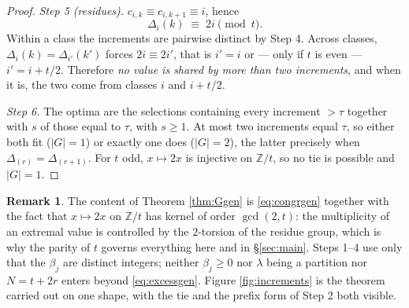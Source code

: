 \documentclass[11pt,reqno]{amsart}
\theoremstyle{plain}
\theoremstyle{definition}
\newtheorem{remark}[theorem]{Remark}
\newcommand{\ZZ}{\mathbb{Z}}
\begin{document}
\begin{proof}
\emph{Step 5 (residues).} $c_{i,k}\equiv c_{i,k+1}\equiv i$, hence
\begin{equation}\label{eq:congrgen}
  \Delta_i(k)\;\equiv\;2i \pmod t .
\end{equation}
Within a class the increments are pairwise distinct by Step 4. Across classes,
$\Delta_i(k)=\Delta_{i'}(k')$ forces $2i\equiv2i'$, that is $i'=i$ or --- only if $t$ is even ---
$i'=i+t/2$. Therefore \emph{no value is shared by more than two increments}, and when it is, the two
come from classes $i$ and $i+t/2$.

\emph{Step 6.} The optima are the selections containing every increment $>\tau$ together with $s$ of
those equal to $\tau$, with $s\ge1$. At most two increments equal $\tau$, so either both fit
($|G|=1$) or exactly one does ($|G|=2$), the latter precisely when $\Delta_{(r)}=\Delta_{(r+1)}$.
For $t$ odd, $x\mapsto2x$ is injective on $\ZZ/t$, so no tie is possible and $|G|=1$.
\end{proof}

\begin{remark}
The content of Theorem \ref{thm:Ggen} is \eqref{eq:congrgen} together with the fact that
$x\mapsto2x$ on $\ZZ/t$ has kernel of order $\gcd(2,t)$: the multiplicity of an extremal value is
controlled by the $2$-torsion of the residue group, which is why the parity of $t$ governs
everything here and in \S\ref{sec:main}. Steps 1--4 use only that the $\beta_j$ are distinct
integers; neither $\beta_j\ge0$ nor $\lambda$ being a partition nor $N=t+2r$ enters beyond
\eqref{eq:excessgen}. Figure \ref{fig:increments} is the theorem carried out on one shape, with the
tie and the prefix form of Step 2 both visible.
\end{remark}
\end{document}
